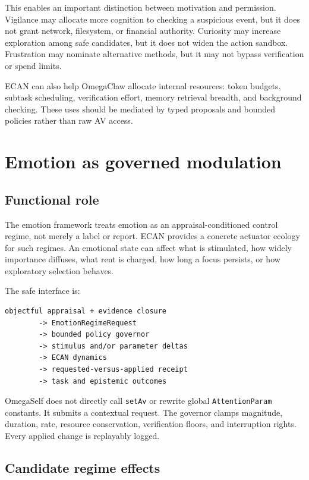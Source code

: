 \documentclass[11pt]{article}
\newcommand{\code}[1]{\texttt{#1}}
\begin{document}
This enables an important distinction between motivation and permission.
Vigilance may allocate more cognition to checking a suspicious event, but it
does not grant network, filesystem, or financial authority.  Curiosity may
increase exploration among safe candidates, but it does not widen the action
sandbox.  Frustration may nominate alternative methods, but it may not bypass
verification or spend limits.

ECAN can also help OmegaClaw allocate internal resources: token budgets,
subtask scheduling, verification effort, memory retrieval breadth, and
background checking.  These uses should be mediated by typed proposals and
bounded policies rather than raw AV access.

\section{Emotion as governed modulation}

\subsection{Functional role}

The emotion framework treats emotion as an appraisal-conditioned control
regime, not merely a label or report.  ECAN provides a concrete actuator ecology
for such regimes.  An emotional state can affect what is stimulated, how widely
importance diffuses, what rent is charged, how long a focus persists, or how
exploratory selection behaves.

The safe interface is:
\begin{verbatim}
objectful appraisal + evidence closure
        -> EmotionRegimeRequest
        -> bounded policy governor
        -> stimulus and/or parameter deltas
        -> ECAN dynamics
        -> requested-versus-applied receipt
        -> task and epistemic outcomes
\end{verbatim}

OmegaSelf does not directly call \code{setAv} or rewrite global
\code{AttentionParam} constants.  It submits a contextual request.  The
governor clamps magnitude, duration, rate, resource conservation, verification
floors, and interruption rights.  Every applied change is replayably logged.

\subsection{Candidate regime effects}
\end{document}
